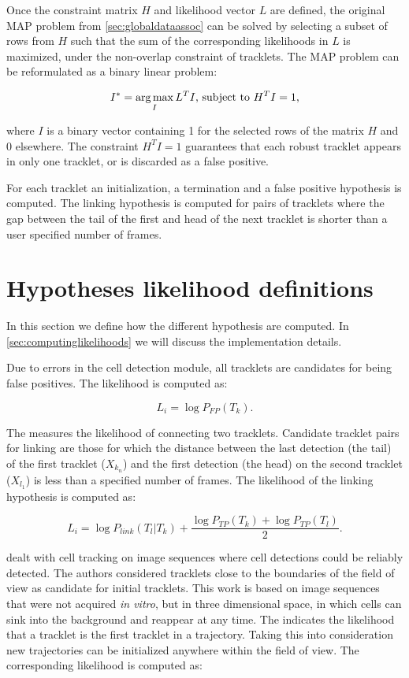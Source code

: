 		Once the constraint matrix $H$ and likelihood vector $L$ are defined, the original MAP problem from \cref{sec:globaldataassoc} can be solved by selecting a subset of rows from $H$ such that the sum of the corresponding likelihoods in $L$ is maximized, under the non-overlap constraint of tracklets. The MAP problem can be reformulated as a binary linear problem:
		
		\[
			I^* = \operatorname*{arg\,max}_I L^T I \text{,    subject to } H^T I = 1 \text{,}
		\]
		
		\noindent where $I$ is a binary vector containing 1 for the selected rows of the matrix $H$ and 0 elsewhere. The constraint $H^T I = 1$ guarantees that each robust tracklet appears in only one tracklet, or is discarded as a false positive.
	 
		For each tracklet an initialization, a termination and a false positive hypothesis is computed. The linking hypothesis is computed for pairs of tracklets where the gap between the tail of the first and head of the next tracklet is shorter than a user specified number of frames.
	 	        		
	 	        		
	\section{Hypotheses likelihood definitions \statusfirstdraft}
		\label{sec:hypothesisdefinition}
		In this section we define how the different hypothesis are computed. In \cref{sec:computinglikelihoods} we will discuss the implementation details.
		
		Due to errors in the cell detection module, all tracklets are candidates for being false positives. The  likelihood is computed as:
		
		\[
			L_i = \log P_{FP}(T_k)\text{.}
		\]
		
		The  measures the likelihood of connecting two tracklets. Candidate tracklet pairs for linking are those for which the distance between the last detection (the tail) of the first tracklet ($X_{k_n}$)  and the first detection (the head) on the second tracklet ($X_{l_1}$) is less than a specified number of frames. The likelihood of the linking hypothesis is computed as:
		
		\[
			L_i = \log P_{link}(T_l | T_k) + \frac{\log P_{TP}(T_k) + \log P_{TP}(T_l)}{2} \text{.}
		\]
		
		\cite{bise11global} dealt with cell tracking on image sequences where cell detections could be reliably detected. The authors considered tracklets close to the boundaries of the field of view as candidate for initial tracklets. This work is based on image sequences that were not acquired \textit{in vitro}, but in three dimensional space, in which cells can sink into the background and reappear at any time. The  indicates the likelihood that a tracklet is the first tracklet in a trajectory. Taking this into consideration new trajectories can be initialized anywhere within the field of view. The corresponding likelihood is computed as:
		
